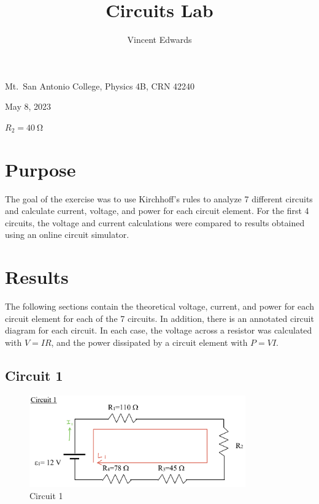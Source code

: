 \documentclass[12pt]{iopart} %
\gdef\units#1{~\mathrm{#1}}
\begin{document}
\title{Circuits Lab}
\author{Vincent Edwards}
\vspace{10pt}
\begin{indented}
  \item[]Mt.~San Antonio College, Physics 4B, CRN 42240
  \item[]May 8, 2023
  \item[]
  \item[]$R_2 = 40 \units{\Omega}$
\end{indented}
\newpage

\section{Purpose}

The goal of the exercise was to use Kirchhoff's rules to analyze 7 different circuits and calculate current, voltage, and power for each circuit element.
For the first 4 circuits, the voltage and current calculations were compared to results obtained using an online circuit simulator.

\section{Results}

The following sections contain the theoretical voltage, current, and power for each circuit element for each of the 7 circuits.
In addition, there is an annotated circuit diagram for each circuit.
In each case, the voltage across a resistor was calculated with $V = IR$, and the power dissipated by a circuit element with $P = VI$.

\subsection{Circuit 1}

\begin{figure}[htbp]
  \begin{indented}
  \item[]\includegraphics[width=0.83\textwidth]{circuit-1.png}
  \end{indented}
  \caption{\label{fig:circuit_1}
  Circuit 1
  }
\end{figure}
\end{document}
